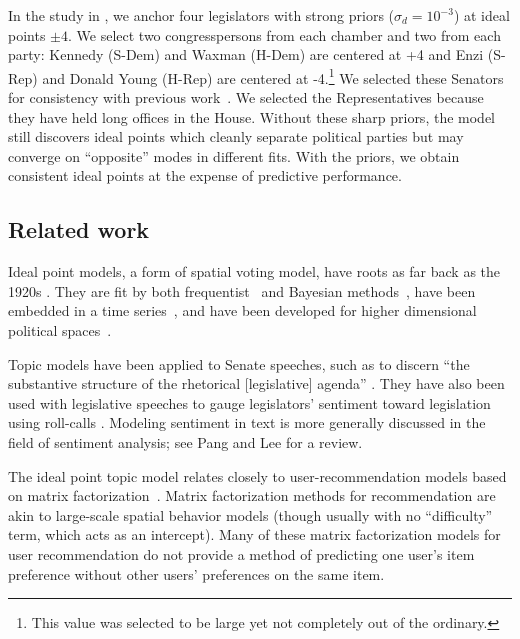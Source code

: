 In the study in , we anchor four legislators with
strong priors ($\sigma_d = 10^{-3}$) at ideal points $\pm 4$.  We
select two congresspersons from each chamber and two from each party:
Kennedy (S-Dem) and Waxman (H-Dem) are centered at +4 and Enzi (S-Rep)
and Donald Young (H-Rep) are centered at -4.\footnote{This value was
selected to be large yet not completely out of the ordinary.} We
selected these Senators for consistency with previous
work~\cite{clinton:2004}.  We selected the Representatives because
they have held long offices in the House.  Without these sharp priors,
the model still discovers ideal points which cleanly separate
political parties but may converge on ``opposite'' modes in different
fits.  With the priors, we obtain consistent ideal points at the
expense of predictive performance.

\subsection*{Related work}


Ideal point models, a form of spatial voting model, have roots as far
back as the 1920s \cite{enelow:1984}. They are fit by both
frequentist~\cite{poole:1985,heckman:1996} and Bayesian
methods~\cite{jackman:2001,martin:2002,clinton:2004}, have been
embedded in a time series~\cite{martin:2002,wang:2010}, and have been
developed for higher dimensional political
spaces~\cite{jackman:2001,heckman:1996}.

\nocite{johnson:1999ch6}

Topic models have been applied to Senate speeches, such as to discern
``the substantive structure of the rhetorical [legislative] agenda''
\cite{quinn:2006}.  They have also been used with legislative speeches
to gauge legislators' sentiment toward legislation using roll-calls
\cite{thomas:2006}.  Modeling sentiment in text is more generally
discussed in the field of sentiment analysis; see Pang and Lee
\cite{pang:2008} for a review.


The ideal point topic model relates closely to user-recommendation
models based on matrix factorization~\cite{salakhutdinov:2008a}.
Matrix factorization methods for recommendation are akin to
large-scale spatial behavior models (though usually with no
``difficulty'' term, which acts as an intercept).  Many of these
matrix factorization models for user recommendation do not provide a
method of predicting one user's item preference without other users'
preferences on the same item.

